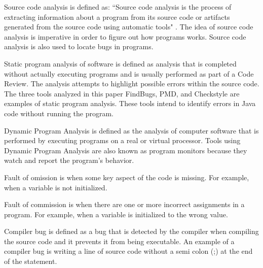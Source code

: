  
 
Source code analysis is defined as: ``Source code analysis is the process of extracting information about a program from its source code or artifacts generated from the source code using automatic tools" \cite{Binkley}. The idea of source code analysis is imperative in order to figure out how programs works. Source code analysis is also used to locate bugs in programs.
  
 Static program analysis of software is defined as analysis that is completed without actually executing programs and is usually performed as part of a Code Review. The analysis attempts to highlight possible errors within the source code. The three tools analyzed in this paper FindBugs, PMD, and Checkstyle are examples of static program analysis. These tools intend to identify errors in Java code without running the program. 

Dynamic Program Analysis is defined as the analysis of computer software that is performed by executing programs on a real or virtual processor. Tools using Dynamic Program Analysis are also known as program monitors because they watch and report the program's behavior. 

Fault of omission is when some key aspect of the code is missing. For example, when a variable is not initialized.

Fault of commission is when there are one or more 
incorrect assignments in a program. For example, when a variable is initialized to the wrong value.

Compiler bug is defined as a bug that is detected by the compiler when compiling the source code and it prevents it from being executable. An example of a compiler bug is writing a line of source code without a semi colon (;) at the end of the statement.

